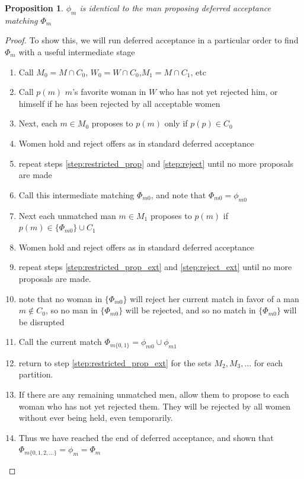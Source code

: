 \documentclass[WP]{AEA}
\newtheorem{prop}{Proposition}
\begin{document}
\begin{prop} \label{prop:equiv}
	$\phi_m $ is identical to the man proposing deferred acceptance matching $\Phi_m $
\end{prop}
\begin{proof}
	
 To show this, we will run deferred acceptance in a particular order to find $\Phi_m$ with a useful intermediate stage
 \begin{enumerate}
 	\item Call $M_0=M\cap C_0$, $W_0 = W \cap C_0$,$M_1 = M \cap C_1$, etc
 	\item Call $p(m)$ $m$'s favorite woman in $W$ who has not yet rejected him, or himself if he has been rejected by all acceptable women
 	\item \label{step:restricted_prop} Next, each $m \in M_0$ proposes to $p(m)$ only if $p(p) \in C_0$
 	\item \label{step:reject} Women hold and reject offers as in standard deferred acceptance
 	\item repeat steps \ref{step:restricted_prop} and \ref{step:reject} until no more proposals are made
 	\item Call this intermediate matching $\Phi_{m0}$, and note that $\Phi_{m0} = \phi_{m0}$
 	\item \label{step:restricted_prop_ext} Next each unmatched man $m \in M_1$ proposes to $p(m)$ if $p(m) \in \{\Phi_{m0}\} \cup C_1$
 	\item \label{step:reject_ext} Women hold and reject offers as in standard deferred acceptance 	
 	\item repeat steps \ref{step:restricted_prop_ext} and \ref{step:reject_ext} until no more proposals are made. 
 	\item note that no woman in $\{\Phi_{m0}\}$ will reject her current match in favor of a man $m\notin C_0$, so no man in $\{\Phi_{m0}\}$ will be rejected, and so no match in $\{\Phi_{m0}\}$  will be disrupted
 	\item Call the current match  $\Phi_{m\{0,1\}}= \phi_{m0} \cup \phi_{m1}$
 	\item return to step \ref{step:restricted_prop_ext} for the sets $M_2, M_3, ...$ for each partition.
 	\item If there are any remaining unmatched men, allow them to propose to each woman who has not yet rejected them. They will be rejected by all women without ever being held, even temporarily.  
 	\item Thus we have reached the end of deferred acceptance, and shown that $\Phi_{m\{0,1,2,...\}}= \phi_{m} =\Phi_{m}$
  \end{enumerate}
\end{proof}
\end{document}

